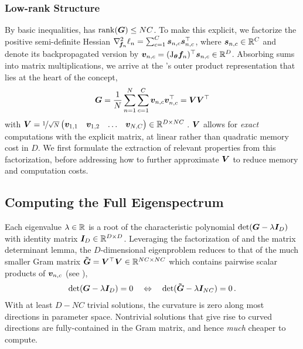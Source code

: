 \subsubsection{Low-rank Structure}

By basic inequalities,  has $\operatorname{rank}({\bm{G}}) \le NC$. To make this explicit, we factorize the positive
semi-definite Hessian $\gradsquared{\vf_n}\ell_n%
= \sum_{c=1}^C \vs_{n,c} \vs_{n,c}^\top$, where ${\bm{s}}_{n,c} \in {\mathbb{R}}^C$ and denote
its backpropagated version by ${\bm{v}}_{n,c} = (\mathrm{J}_{{\bm{\theta}}} {\bm{f}}_n)^\top {\bm{s}}_{n,c}
\in {\mathbb{R}}^D$. Absorbing sums into matrix multiplications, we arrive at the \ggn's
outer product representation that lies at the heart of the \vivit concept,
\begin{equation}
  \label{vivit::eq:ggn-factorization}
  {\bm{G}}
  =
  \frac{1}{N}
  \sum_{n=1}^{N}
  \sum_{c=1}^{C}
  {\bm{v}}_{n,c} {\bm{v}}_{n,c}^\top
  =
  {\bm{V}} {\bm{V}}^\top
\end{equation}
with ${\bm{V}} = \nicefrac{1}{\sqrt{N}}
\begin{pmatrix}
  {\bm{v}}_{1,1} &  {\bm{v}}_{1,2} & \dots & {\bm{v}}_{N,C}
\end{pmatrix}
\in {\mathbb{R}}^{D\times NC}\,$. ${\bm{V}}$ allows for \emph{exact} computations with the
explicit \ggn matrix, at linear rather than quadratic memory cost in $D$. We
first formulate the extraction of relevant \ggn properties from this
factorization, before addressing how to further approximate ${\bm{V}}$ to reduce
memory and computation costs.

\subsection{Computing the Full \ggn Eigenspectrum}
\label{vivit::sec:computing-full-ggn-eigenspectrum}

Each \ggn eigenvalue $\lambda \in {\mathbb{R}}$ is a root of the characteristic
polynomial $\det({\bm{G}} - \lambda {\bm{I}}_D)$ with identity matrix ${\bm{I}}_D \in
{\mathbb{R}}^{D\times D}$. Leveraging the factorization of 
and the matrix determinant lemma, the $D$-dimensional eigenproblem reduces to
that of the much smaller Gram matrix $\bm{\tilde{{\bm{G}}}} = {\bm{V}}^\top {\bm{V}} \in {\mathbb{R}}^{NC \times
  NC}$ which contains pairwise scalar products of ${\bm{v}}_{n,c}$ (see
),
\begin{align}
  \det({\bm{G}} - \lambda {\bm{I}}_D) = 0
  \quad
  \Leftrightarrow
  \quad
  \det(\bm{\tilde{{\bm{G}}}} - \lambda {\bm{I}}_{NC}) = 0\,.
  \label{vivit::eq:ggn-eigenvalues}
\end{align}
With at least $D-NC$ trivial solutions,
the \ggn curvature is zero along most directions in parameter space. Nontrivial
solutions that give rise to curved directions are fully-contained in the Gram
matrix, and hence \textit{much} cheaper to compute.

